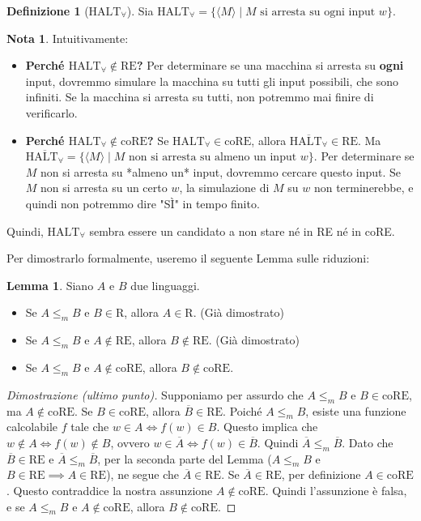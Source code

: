 \documentclass[a4paper]{article}
\theoremstyle{definition} %
\newtheorem{definition}{Definizione}
\newtheorem{lemma}{Lemma}
\newtheorem{remark}{Nota}
\begin{document}
\begin{definition}[$\text{HALT}_\forall$]
Sia $\text{HALT}_\forall = \{ \langle M \rangle \mid M \text{ si arresta su ogni input } w \}$.
\end{definition}

\begin{remark}
Intuitivamente:
\begin{itemize}
    \item \textbf{Perché $\text{HALT}_\forall \notin \text{RE}$?} Per determinare se una macchina si arresta su \textbf{ogni} input, dovremmo simulare la macchina su tutti gli input possibili, che sono infiniti. Se la macchina si arresta su tutti, non potremmo mai finire di verificarlo.
    \item \textbf{Perché $\text{HALT}_\forall \notin \text{coRE}$?} Se $\text{HALT}_\forall \in \text{coRE}$, allora $\overline{\text{HALT}_\forall} \in \text{RE}$. Ma $\overline{\text{HALT}_\forall} = \{ \langle M \rangle \mid M \text{ non si arresta su almeno un input } w \}$. Per determinare se $M$ non si arresta su *almeno un* input, dovremmo cercare questo input. Se $M$ non si arresta su un certo $w$, la simulazione di $M$ su $w$ non terminerebbe, e quindi non potremmo dire "SÌ" in tempo finito.
\end{itemize}
Quindi, $\text{HALT}_\forall$ sembra essere un candidato a non stare né in RE né in coRE.

Per dimostrarlo formalmente, useremo il seguente Lemma sulle riduzioni:
\end{remark}

\begin{lemma}
Siano $A$ e $B$ due linguaggi.
\begin{itemize}
    \item Se $A \le_m B$ e $B \in \text{R}$, allora $A \in \text{R}$. (Già dimostrato)
    \item Se $A \le_m B$ e $A \notin \text{RE}$, allora $B \notin \text{RE}$. (Già dimostrato)
    \item Se $A \le_m B$ e $A \notin \text{coRE}$, allora $B \notin \text{coRE}$.
\end{itemize}
\end{lemma}
\begin{proof}[Dimostrazione (ultimo punto)]
Supponiamo per assurdo che $A \le_m B$ e $B \in \text{coRE}$, ma $A \notin \text{coRE}$.
Se $B \in \text{coRE}$, allora $\overline{B} \in \text{RE}$.
Poiché $A \le_m B$, esiste una funzione calcolabile $f$ tale che $w \in A \iff f(w) \in B$.
Questo implica che $w \notin A \iff f(w) \notin B$, ovvero $w \in \overline{A} \iff f(w) \in \overline{B}$.
Quindi $\overline{A} \le_m \overline{B}$.
Dato che $\overline{B} \in \text{RE}$ e $\overline{A} \le_m \overline{B}$, per la seconda parte del Lemma ($A \le_m B$ e $B \in \text{RE} \implies A \in \text{RE}$), ne segue che $\overline{A} \in \text{RE}$.
Se $\overline{A} \in \text{RE}$, per definizione $A \in \text{coRE}$. Questo contraddice la nostra assunzione $A \notin \text{coRE}$.
Quindi l'assunzione è falsa, e se $A \le_m B$ e $A \notin \text{coRE}$, allora $B \notin \text{coRE}$.
\end{proof}
\end{document}
